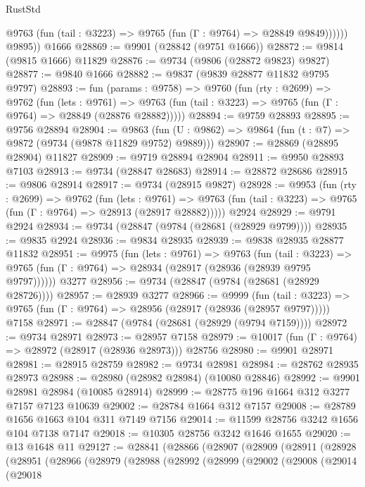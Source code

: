 \begin{lexlean}{RustStd}
\begin{coremodule}
              @9763 (fun (tail : @3223) => @9765 (fun (Γ : @9764) => @28849 @9849))))))
        @9895))
    @1666
@28869 := @9901 (@28842 (@9751 @1666))
@28872 := @9814 (@9815 @1666) @11829
@28876 := @9734 (@9806 (@28872 @9823) @9827)
@28877 := @9840 @1666
@28882 := @9837 (@9839 @28877 @11832 @9795 @9797)
@28893 := fun (params : @9758) =>
  @9760
    (fun (rty : @2699) =>
    @9762
      (fun (lets : @9761) =>
      @9763 (fun (tail : @3223) => @9765 (fun (Γ : @9764) => @28849 (@28876 @28882)))))
@28894 := @9759 @28893
@28895 := @9756 @28894
@28904 := @9863
    (fun (U : @9862) => @9864 (fun (t : @7) => @9872 (@9734 (@9878 @11829 @9752) @9889)))
@28907 := @28869 (@28895 @28904) @11827
@28909 := @9719 @28894 @28904
@28911 := @9950 @28893 @7103
@28913 := @9734 (@28847 @28683)
@28914 := @28872 @28686
@28915 := @9806 @28914
@28917 := @9734 (@28915 @9827)
@28928 := @9953
    (fun (rty : @2699) =>
    @9762
      (fun (lets : @9761) =>
      @9763 (fun (tail : @3223) => @9765 (fun (Γ : @9764) => @28913 (@28917 @28882)))))
    @2924
@28929 := @9791 @2924
@28934 := @9734 (@28847 (@9784 (@28681 (@28929 @9799))))
@28935 := @9835 @2924
@28936 := @9834 @28935
@28939 := @9838 @28935 @28877 @11832
@28951 := @9975
    (fun (lets : @9761) =>
    @9763
      (fun (tail : @3223) =>
      @9765 (fun (Γ : @9764) => @28934 (@28917 (@28936 (@28939 @9795 @9797))))))
    @3277
@28956 := @9734 (@28847 (@9784 (@28681 (@28929 @28726))))
@28957 := @28939 @3277
@28966 := @9999
    (fun (tail : @3223) => @9765 (fun (Γ : @9764) => @28956 (@28917 (@28936 (@28957 @9797)))))
    @7158
@28971 := @28847 (@9784 (@28681 (@28929 (@9794 @7159))))
@28972 := @9734 @28971
@28973 := @28957 @7158
@28979 := @10017 (fun (Γ : @9764) => @28972 (@28917 (@28936 @28973))) @28756
@28980 := @9901 @28971
@28981 := @28915 @28759
@28982 := @9734 @28981
@28984 := @28762 @28935 @28973
@28988 := @28980 (@28982 @28984) (@10080 @28846)
@28992 := @9901 @28981 @28984 (@10085 @28914)
@28999 := @28775 @196 @1664 @312 @3277 @7157 @7123 @10639
@29002 := @28784 @1664 @312 @7157
@29008 := @28789 @1656 @1663 @104 @311 @7149 @7156
@29014 := @11599 @28756 @3242 @1656 @104 @7138 @7147
@29018 := @10305 @28756 @3242 @1646 @1655
@29020 := @13 @1648 @11
@29127 := @28841
    (@28866
      (@28907
        (@28909
          (@28911
            (@28928
              (@28951
                (@28966
                  (@28979
                    (@28988
                      (@28992
                        (@28999
                          (@29002
                            (@29008
                              (@29014
                                (@29018

\end{coremodule}
\end{lexlean}
